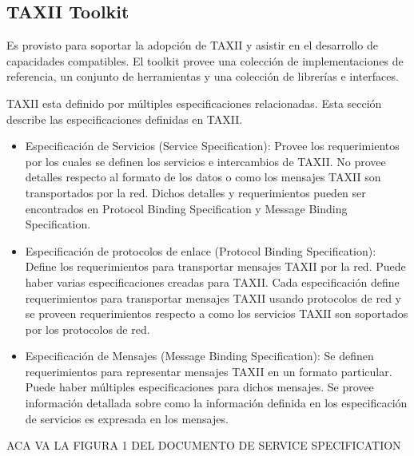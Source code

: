 \subsection{TAXII Toolkit}
Es provisto para soportar la adopción de TAXII y asistir en el desarrollo de 
capacidades compatibles. El toolkit provee una colección de implementaciones de 
referencia, un conjunto de herramientas y una colección de librerías e 
interfaces.


TAXII esta definido por múltiples especificaciones relacionadas. Esta sección 
describe las especificaciones definidas en TAXII.

\begin{itemize}
  
\item Especificación de Servicios (Service Specification): Provee los requerimientos por los cuales se definen los servicios e intercambios 
de TAXII. No provee detalles respecto al formato de los datos o como los 
mensajes TAXII son transportados por la red. Dichos detalles y requerimientos 
pueden ser encontrados en Protocol Binding Specification y Message Binding 
Specification.
\item Especificación de protocolos de enlace (Protocol Binding Specification): 
Define los requerimientos para transportar mensajes TAXII por la red. Puede 
haber varias especificaciones creadas para TAXII. Cada especificación define 
requerimientos para transportar mensajes TAXII usando protocolos de red y se 
proveen requerimientos respecto a como los servicios TAXII son soportados por 
los protocolos de red.
\item Especificación de Mensajes (Message Binding Specification): Se definen 
requerimientos para representar mensajes TAXII en un formato particular. Puede 
haber múltiples especificaciones para dichos mensajes. Se provee información 
detallada sobre como la información definida en los especificación de servicios 
es expresada en los mensajes.
\end{itemize}

ACA VA LA FIGURA 1 DEL DOCUMENTO DE SERVICE SPECIFICATION

